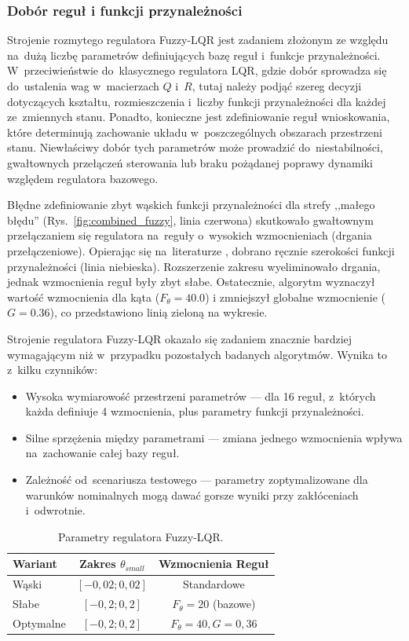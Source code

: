 \subsubsection{Dobór reguł i funkcji przynależności}
Strojenie rozmytego regulatora Fuzzy-LQR jest zadaniem złożonym ze względu na~dużą
liczbę parametrów definiujących bazę reguł i~funkcje przynależności. 
W~przeciwieństwie do~klasycznego regulatora LQR, gdzie dobór sprowadza się do~ustalenia 
wag w~macierzach $Q$ i~$R$, tutaj należy podjąć szereg decyzji 
dotyczących kształtu, rozmieszczenia i~liczby funkcji przynależności dla każdej 
ze~zmiennych stanu. Ponadto, konieczne jest zdefiniowanie reguł wnioskowania, 
które determinują zachowanie układu w~poszczególnych obszarach przestrzeni stanu. 
Niewłaściwy dobór tych parametrów może prowadzić do~niestabilności, gwałtownych 
przełączeń sterowania lub braku pożądanej poprawy dynamiki względem regulatora bazowego.

Błędne zdefiniowanie zbyt wąskich funkcji przynależności dla strefy ,,małego błędu''
(Rys.~\ref{fig:combined_fuzzy}, linia czerwona) skutkowało gwałtownym przełączaniem się regulatora 
na~reguły o~wysokich wzmocnieniach (drgania przełączeniowe).
Opierając się na~literaturze \cite{Nguyen2024}, dobrano ręcznie szerokości funkcji przynależności (linia niebieska).
Rozszerzenie zakresu wyeliminowało drgania, jednak wzmocnienia reguł były zbyt słabe.
Ostatecznie, algorytm wyznaczył wartość wzmocnienia
dla kąta ($F_{\theta}=40.0$) i zmniejszył globalne wzmocnienie
($G=0.36$), co przedstawiono linią zieloną na wykresie.

Strojenie regulatora Fuzzy-LQR okazało się zadaniem znacznie bardziej wymagającym 
niż w~przypadku pozostałych badanych algorytmów. Wynika to z~kilku czynników:
\begin{itemize}
    \item Wysoka wymiarowość przestrzeni parametrów --- dla 16 reguł, 
    z~których każda definiuje 4 wzmocnienia, plus parametry funkcji przynależności.
    \item Silne sprzężenia między parametrami --- zmiana jednego wzmocnienia 
    wpływa na~zachowanie całej bazy reguł.
    \item Zależność od~scenariusza testowego --- parametry zoptymalizowane 
    dla warunków nominalnych mogą dawać gorsze wyniki przy zakłóceniach i~odwrotnie.
\end{itemize}

\begin{table}[H]
    \centering
    \caption{Parametry regulatora Fuzzy-LQR.}
    \label{tab:params_fuzzy}
    \begin{tabular}{|l|c|c|}
        \hline
        \textbf{Wariant} & \textbf{Zakres $\theta_{small}$} & \textbf{Wzmocnienia Reguł} \\
        \hline
        Wąski & $[-0{,}02; 0{,}02]$ & Standardowe \\ \hline
        Słabe & $[-0{,}2; 0{,}2]$ & $F_{\theta}=20$ (bazowe) \\ \hline
        Optymalne & $[-0{,}2; 0{,}2]$ & $F_{\theta}=40, G=0{,}36$ \\ \hline
    \end{tabular}
\end{table}

